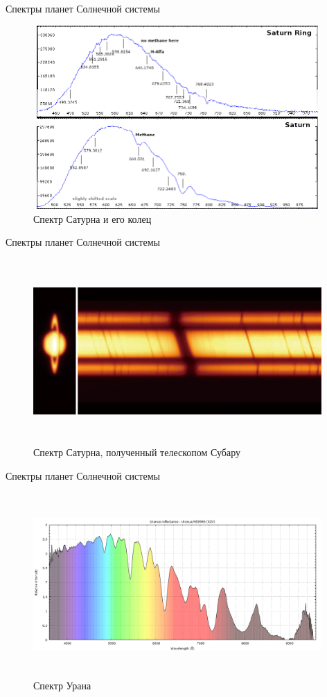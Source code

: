 \documentclass[
]{beamer}
\begin{document}
	\begin{frame}{Спектры планет Солнечной системы}
		\begin{figure}[H]
			\centering
			\includegraphics[width=11cm, height=7cm]{saturn-ring-spec.png}
			\caption{Спектр Сатурна и его колец}
		\end{figure}
	\end{frame}

	\begin{frame}{Спектры планет Солнечной системы}
		\begin{figure}[H]
			\centering
			\includegraphics[width=11cm, height=7cm]{fig1.jpg}
			\caption{Спектр Сатурна, полученный телескопом Субару}
		\end{figure}
	\end{frame}

	\begin{frame}{Спектры планет Солнечной системы}
		\begin{figure}[H]
			\centering
			\includegraphics[width=11cm, height=7cm]{уран.png}
			\caption{Спектр Урана}
		\end{figure}
	\end{frame}
	
\end{document}
